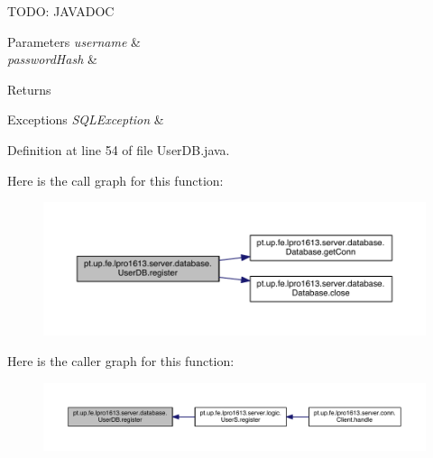 T\+O\+DO\+: J\+A\+V\+A\+D\+OC 
\begin{DoxyParams}{Parameters}
{\em username} & \\
\hline
{\em password\+Hash} & \\
\hline
\end{DoxyParams}
\begin{DoxyReturn}{Returns}

\end{DoxyReturn}

\begin{DoxyExceptions}{Exceptions}
{\em S\+Q\+L\+Exception} & \\
\hline
\end{DoxyExceptions}


Definition at line 54 of file User\+D\+B.\+java.

Here is the call graph for this function\+:
\nopagebreak
\begin{figure}[H]
\begin{center}
\leavevmode
\includegraphics[width=350pt]{classpt_1_1up_1_1fe_1_1lpro1613_1_1server_1_1database_1_1_user_d_b_a1bcefeca4058dd57c0d2c0a7387af2e1_cgraph}
\end{center}
\end{figure}
Here is the caller graph for this function\+:
\nopagebreak
\begin{figure}[H]
\begin{center}
\leavevmode
\includegraphics[width=350pt]{classpt_1_1up_1_1fe_1_1lpro1613_1_1server_1_1database_1_1_user_d_b_a1bcefeca4058dd57c0d2c0a7387af2e1_icgraph}
\end{center}
\end{figure}
\hypertarget{classpt_1_1up_1_1fe_1_1lpro1613_1_1server_1_1database_1_1_user_d_b_ac3083ed924599ce2b694ce622676bca6}{}\label{classpt_1_1up_1_1fe_1_1lpro1613_1_1server_1_1database_1_1_user_d_b_ac3083ed924599ce2b694ce622676bca6} 
